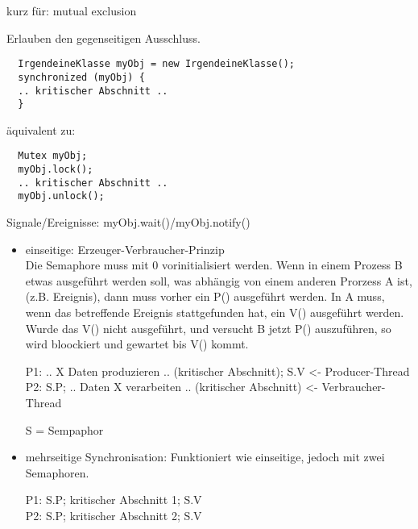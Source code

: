 \begin{answer}
kurz für: mutual exclusion

Erlauben den gegenseitigen Ausschluss.

\begin{verbatim}
  IrgendeineKlasse myObj = new IrgendeineKlasse();
  synchronized (myObj) {
  .. kritischer Abschnitt ..
  }
\end{verbatim}

äquivalent zu:

\begin{verbatim}
  Mutex myObj;
  myObj.lock();
  .. kritischer Abschnitt ..
  myObj.unlock();
\end{verbatim}

Signale/Ereignisse: myObj.wait()/myObj.notify()
\end{answer}



\begin{answer}

\begin{itemize}

  \item einseitige: Erzeuger-Verbraucher-Prinzip \\
    Die Semaphore muss mit 0 vorinitialisiert werden. Wenn in einem Prozess B etwas ausgeführt werden soll, was abhängig von einem anderen Prorzess A ist, (z.B. Ereignis), dann muss vorher ein P() ausgeführt werden. In A muss, wenn das betreffende Ereignis stattgefunden hat, ein V() ausgeführt werden. Wurde das V() nicht ausgeführt, und versucht B jetzt P() auszuführen, so wird bloockiert und gewartet bis V() kommt.

    P1: .. X Daten produzieren .. (kritischer Abschnitt); S.V <- Producer-Thread \\
    P2: S.P; .. Daten X verarbeiten .. (kritischer Abschnitt) <- Verbraucher-Thread

    S = Sempaphor

  \item mehrseitige Synchronisation: Funktioniert wie einseitige, jedoch mit zwei Semaphoren.

      P1: S.P; kritischer Abschnitt 1; S.V \\
      P2: S.P; kritischer Abschnitt 2; S.V

\end{itemize}
\end{answer}

